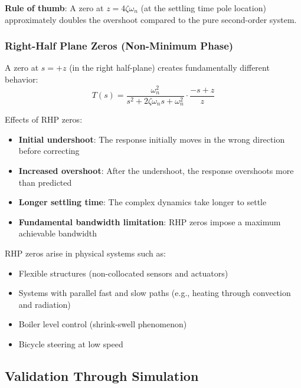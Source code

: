 \textbf{Rule of thumb}: A zero at $z = 4\zeta\omega_n$ (at the settling time pole location) approximately doubles the overshoot compared to the pure second-order system.

\subsubsection{Right-Half Plane Zeros (Non-Minimum Phase)}

A zero at $s = +z$ (in the right half-plane) creates fundamentally different behavior:
\begin{equation}
    T(s) = \frac{\omega_n^2}{s^2 + 2\zeta\omega_n s + \omega_n^2} \cdot \frac{-s + z}{z}
\end{equation}

Effects of RHP zeros:
\begin{itemize}
    \item \textbf{Initial undershoot}: The response initially moves in the wrong direction before correcting
    \item \textbf{Increased overshoot}: After the undershoot, the response overshoots more than predicted
    \item \textbf{Longer settling time}: The complex dynamics take longer to settle
    \item \textbf{Fundamental bandwidth limitation}: RHP zeros impose a maximum achievable bandwidth
\end{itemize}

RHP zeros arise in physical systems such as:
\begin{itemize}
    \item Flexible structures (non-collocated sensors and actuators)
    \item Systems with parallel fast and slow paths (e.g., heating through convection and radiation)
    \item Boiler level control (shrink-swell phenomenon)
    \item Bicycle steering at low speed
\end{itemize}


\subsection{Validation Through Simulation}

